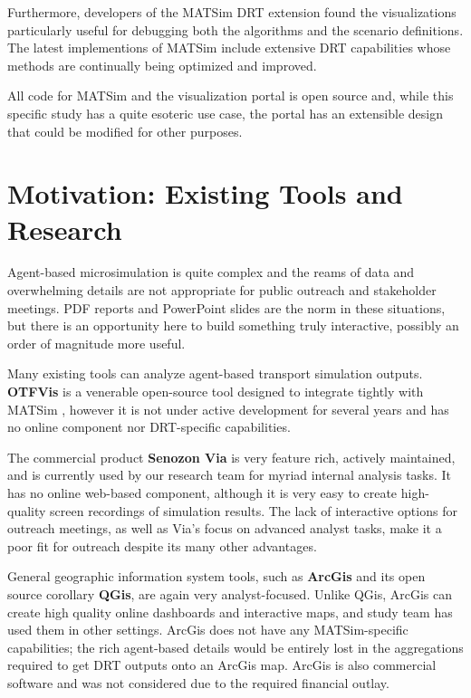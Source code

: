 \documentclass[3p,times,procedia]{elsarticle}
\begin{document}
Furthermore, developers of the MATSim DRT extension found the visualizations particularly useful for debugging both the algorithms and the scenario definitions. The latest implementions of MATSim include extensive DRT capabilities whose methods are continually being optimized and improved.

All code for MATSim and the visualization portal is open source and, while this specific study has a quite esoteric use case, the portal has an extensible design that could be modified for other purposes.

\section{Motivation: Existing Tools and Research}
\label{motivation}

Agent-based microsimulation is quite complex and the reams of data and overwhelming details are not appropriate for public outreach and stakeholder meetings. PDF reports and PowerPoint slides are the norm in these situations, but there is an opportunity here to build something truly interactive, possibly an order of magnitude more useful.

Many existing tools can analyze agent-based transport simulation outputs. \textbf{OTFVis} is a venerable open-source tool designed to integrate tightly with MATSim \cite{Srippgen2015OTFVisInBook}, however it is not under active development for several years and has no online component nor DRT-specific capabilities.

The commercial product \textbf{Senozon Via} \cite{Rieser2015SenozonViaInBook} is very feature rich, actively maintained, and is currently used by our research team for myriad internal analysis tasks. It has no online web-based component, although it is very easy to create high-quality screen recordings of simulation results. The lack of interactive options for outreach meetings, as well as Via's focus on advanced analyst tasks, make it a poor fit for outreach despite its many other advantages.

General geographic information system tools, such as \textbf{ArcGis} and its open source corollary \textbf{QGis}, are again very analyst-focused. Unlike QGis, ArcGis can create high quality online dashboards and interactive maps, and study team has used them in other settings. ArcGis does not have any MATSim-specific capabilities; the rich agent-based details would be entirely lost in the aggregations required to get DRT outputs onto an ArcGis map. ArcGis is also commercial software and was not considered due to the required financial outlay.
\end{document}
